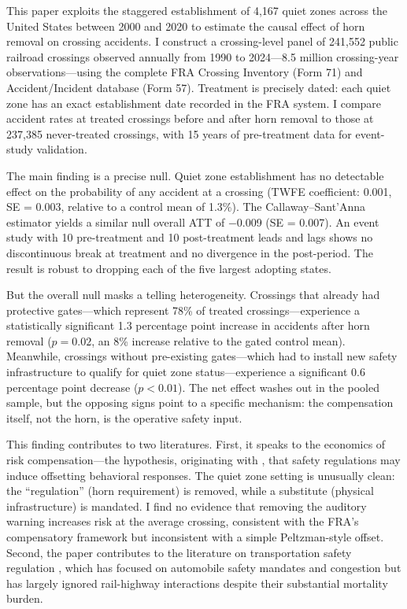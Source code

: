 \documentclass[12pt]{article}
\begin{document}
This paper exploits the staggered establishment of 4,167 quiet zones across the United States between 2000 and 2020 to estimate the causal effect of horn removal on crossing accidents. I construct a crossing-level panel of 241,552 public railroad crossings observed annually from 1990 to 2024---8.5 million crossing-year observations---using the complete FRA Crossing Inventory (Form 71) and Accident/Incident database (Form 57). Treatment is precisely dated: each quiet zone has an exact establishment date recorded in the FRA system. I compare accident rates at treated crossings before and after horn removal to those at 237,385 never-treated crossings, with 15 years of pre-treatment data for event-study validation.

The main finding is a precise null. Quiet zone establishment has no detectable effect on the probability of any accident at a crossing (TWFE coefficient: 0.001, SE = 0.003, relative to a control mean of 1.3\%). The Callaway--Sant'Anna estimator yields a similar null overall ATT of $-$0.009 (SE = 0.007). An event study with 10 pre-treatment and 10 post-treatment leads and lags shows no discontinuous break at treatment and no divergence in the post-period. The result is robust to dropping each of the five largest adopting states.

But the overall null masks a telling heterogeneity. Crossings that already had protective gates---which represent 78\% of treated crossings---experience a statistically significant 1.3 percentage point increase in accidents after horn removal ($p = 0.02$, an 8\% increase relative to the gated control mean). Meanwhile, crossings without pre-existing gates---which had to install new safety infrastructure to qualify for quiet zone status---experience a significant 0.6 percentage point decrease ($p < 0.01$). The net effect washes out in the pooled sample, but the opposing signs point to a specific mechanism: the compensation itself, not the horn, is the operative safety input.

This finding contributes to two literatures. First, it speaks to the economics of risk compensation---the hypothesis, originating with \citet{peltzman1975effects}, that safety regulations may induce offsetting behavioral responses. The quiet zone setting is unusually clean: the ``regulation'' (horn requirement) is removed, while a substitute (physical infrastructure) is mandated. I find no evidence that removing the auditory warning increases risk at the average crossing, consistent with the FRA's compensatory framework but inconsistent with a simple Peltzman-style offset. Second, the paper contributes to the literature on transportation safety regulation \citep{ashenfelter2004using, viscusi1993value, anderson2014subways}, which has focused on automobile safety mandates and congestion but has largely ignored rail-highway interactions despite their substantial mortality burden.
\end{document}

